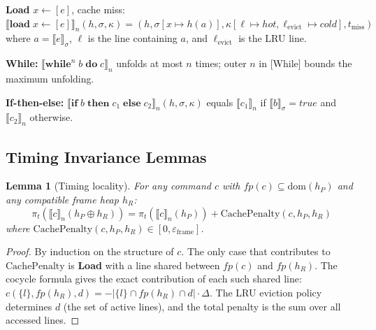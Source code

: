 \documentclass[acmsmall,sigplan,anonymous,review,screen]{acmart}
\theoremstyle{plain}
\newtheorem{lemma}[theorem]{Lemma}
\theoremstyle{definition}
\newcommand{\fp}{\mathit{fp}}
\newcommand{\defect}{\varepsilon}
\begin{document}
\medskip
\noindent\textbf{Load} $x \leftarrow [e]$, cache miss:
$\llbracket \mathbf{load}\; x \leftarrow [e] \rrbracket_n(h, \sigma, \kappa) =
(h, \sigma[x \mapsto h(a)], \kappa[\ell \mapsto \mathit{hot}, \ell_{\mathrm{evict}} \mapsto \mathit{cold}], t_{\mathrm{miss}})$
where $a = \llbracket e \rrbracket_\sigma$, $\ell$ is the line containing $a$,
and $\ell_{\mathrm{evict}}$ is the LRU line.

\medskip
\noindent\textbf{While:}
$\llbracket \mathbf{while}^n\; b\; \mathbf{do}\; c \rrbracket_n$ unfolds
at most $n$ times; outer $n$ in [While] bounds the maximum unfolding.

\medskip
\noindent\textbf{If-then-else:}
$\llbracket \mathbf{if}\; b\; \mathbf{then}\; c_1\; \mathbf{else}\; c_2 \rrbracket_n(h, \sigma, \kappa)$
equals $\llbracket c_1 \rrbracket_n$ if $\llbracket b \rrbracket_\sigma = \mathit{true}$
and $\llbracket c_2 \rrbracket_n$ otherwise.

\subsection{Timing Invariance Lemmas}
\label{sec:semantics:timing}

\begin{lemma}[Timing locality]
\label{lem:time-local}
  For any command $c$ with $\fp(c) \subseteq \mathrm{dom}(h_P)$ and
  any compatible frame heap $h_R$:
  \[
    \pi_t(\llbracket c \rrbracket_n(h_P \oplus h_R)) =
    \pi_t(\llbracket c \rrbracket_n(h_P)) + \mathrm{CachePenalty}(c, h_P, h_R)
  \]
  where $\mathrm{CachePenalty}(c, h_P, h_R) \in [0, \defect_{\mathrm{frame}}]$.
\end{lemma}
\begin{proof}
  By induction on the structure of $c$.  The only case that contributes
  to $\mathrm{CachePenalty}$ is \textbf{Load} with a line shared between
  $\fp(c)$ and $\fp(h_R)$.  The cocycle formula gives the exact contribution
  of each such shared line: $c(\{l\}, \fp(h_R), d) = -|\{l\} \cap \fp(h_R) \cap d|
  \cdot \Delta$.  The LRU eviction policy determines $d$ (the set of active
  lines), and the total penalty is the sum over all accessed lines.
\end{proof}
\end{document}
